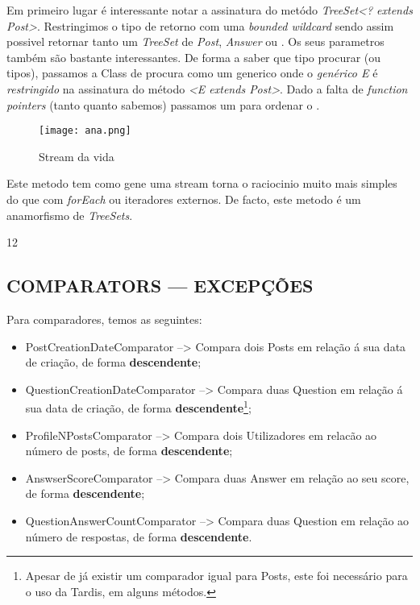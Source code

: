 \documentclass[letterpaper, 10 pt, conference]{IEEEtran} %
\begin{document}
Em primeiro lugar é interessante notar a assinatura do metódo \textit{TreeSet<? extends Post>}. Restringimos o tipo de retorno com uma \textit{bounded wildcard} sendo assim possivel retornar tanto um \textit{TreeSet} de \textit{Post}, \textit{Answer} ou .
Os seus parametros também são bastante interessantes. De forma a saber que tipo procurar (ou tipos), passamos a Class de procura como um generico  onde o \textit{genérico E} é \textit{restringido} na assinatura do método \textit{<E extends Post>}.
Dado a falta de \textit{function pointers} (tanto quanto sabemos) passamos um  para ordenar o .

\begin{figure}[h!]
  \centering
  \texttt{[image: ana.png]}
   \caption{Stream da vida}
\end{figure}


Este metodo tem como gene uma stream torna o raciocinio muito mais simples do que com \textit{forEach} ou iteradores externos.
De facto, este metodo é um anamorfismo de \textit{TreeSets}.

12


\subsection{COMPARATORS --- EXCEPÇÕES}

Para comparadores, temos as seguintes:
\begin{itemize}
    \item PostCreationDateComparator --> Compara dois Posts em relação á sua data de criação, de forma \textbf{descendente};
    \item QuestionCreationDateComparator --> Compara duas Question em relação á sua data de criação, de forma \textbf{descendente}\footnote{Apesar de já existir um comparador igual para Posts, este foi necessário para o uso da Tardis, em alguns métodos.};
    \item ProfileNPostsComparator --> Compara dois Utilizadores em relacão ao número de posts, de forma \textbf{descendente};
    \item AnswserScoreComparator --> Compara duas Answer em relação ao seu score, de forma \textbf{descendente};
    \item QuestionAnswerCountComparator --> Compara duas Question em relação ao número de respostas, de forma \textbf{descendente}.
\end{itemize}
\end{document}
